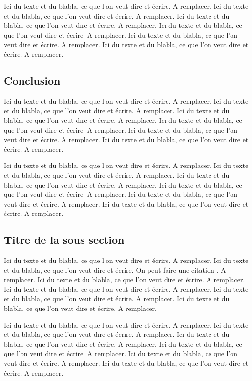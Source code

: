 Ici du texte et du blabla, ce que l'on veut dire et écrire. A remplacer. Ici du texte et du blabla, ce que l'on veut dire et écrire. A remplacer. Ici du texte et du blabla, ce que l'on veut dire et écrire. A remplacer. Ici du texte et du blabla, ce que l'on veut dire et écrire. A remplacer. Ici du texte et du blabla, ce que l'on veut dire et écrire. A remplacer. Ici du texte et du blabla, ce que l'on veut dire et écrire. A remplacer.

\subsection{Conclusion}

Ici du texte et du blabla, ce que l'on veut dire et écrire. A remplacer. Ici du texte et du blabla, ce que l'on veut dire et écrire. A remplacer. Ici du texte et du blabla, ce que l'on veut dire et écrire. A remplacer. Ici du texte et du blabla, ce que l'on veut dire et écrire. A remplacer. Ici du texte et du blabla, ce que l'on veut dire et écrire. A remplacer. Ici du texte et du blabla, ce que l'on veut dire et écrire. A remplacer.

Ici du texte et du blabla, ce que l'on veut dire et écrire. A remplacer. Ici du texte et du blabla, ce que l'on veut dire et écrire. A remplacer. Ici du texte et du blabla, ce que l'on veut dire et écrire. A remplacer. Ici du texte et du blabla, ce que l'on veut dire et écrire. A remplacer. Ici du texte et du blabla, ce que l'on veut dire et écrire. A remplacer. Ici du texte et du blabla, ce que l'on veut dire et écrire. A remplacer.

\subsection{Titre de la sous section}

Ici du texte et du blabla, ce que l'on veut dire et écrire. A remplacer. Ici du texte et du blabla, ce que l'on veut dire et écrire. On peut faire une citation \cite{MotClef4}.
A remplacer. Ici du texte et du blabla, ce que l'on veut dire et écrire. A remplacer. Ici du texte et du blabla, ce que l'on veut dire et écrire. A remplacer. Ici du texte et du blabla, ce que l'on veut dire et écrire. A remplacer. Ici du texte et du blabla, ce que l'on veut dire et écrire. A remplacer.

Ici du texte et du blabla, ce que l'on veut dire et écrire. A remplacer. Ici du texte et du blabla, ce que l'on veut dire et écrire. A remplacer.
Ici du texte et du blabla, ce que l'on veut dire et écrire. A remplacer. Ici du texte et du blabla, ce que l'on veut dire et écrire. A remplacer. Ici du texte et du blabla, ce que l'on veut dire et écrire. A remplacer. Ici du texte et du blabla, ce que l'on veut dire et écrire. A remplacer.

